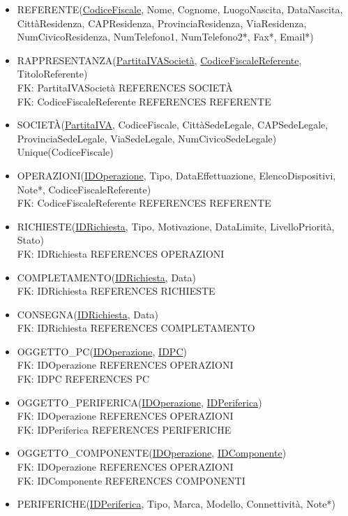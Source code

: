 \documentclass[a4paper,12pt]{report}
\begin{document}
\begin{itemize}
	\item REFERENTE(\underline{CodiceFiscale}, Nome, Cognome, LuogoNascita, DataNascita, CittàResidenza, CAPResidenza, ProvinciaResidenza, ViaResidenza, NumCivicoResidenza, NumTelefono1, NumTelefono2*, Fax*, Email*)
	\item RAPPRESENTANZA(\underline{PartitaIVASocietà}, \underline{CodiceFiscaleReferente}, TitoloReferente)
		\\ FK: PartitaIVASocietà REFERENCES SOCIETÀ
		\\ FK: CodiceFiscaleReferente REFERENCES REFERENTE
	\item SOCIETÀ(\underline{PartitaIVA}, CodiceFiscale, CittàSedeLegale, CAPSedeLegale, ProvinciaSedeLegale, ViaSedeLegale, NumCivicoSedeLegale)
		\\ Unique(CodiceFiscale)
	\item OPERAZIONI(\underline{IDOperazione}, Tipo, DataEffettuazione, ElencoDispositivi, Note*, CodiceFiscaleReferente)
		\\ FK: CodiceFiscaleReferente REFERENCES REFERENTE
	\item RICHIESTE(\underline{IDRichiesta}, Tipo, Motivazione, DataLimite, LivelloPriorità, Stato)
		\\ FK: IDRichiesta REFERENCES OPERAZIONI
	\item COMPLETAMENTO(\underline{IDRichiesta}, Data)
		\\ FK: IDRichiesta REFERENCES RICHIESTE
	\item CONSEGNA(\underline{IDRichiesta}, Data)
		\\ FK: IDRichiesta REFERENCES COMPLETAMENTO
	\item OGGETTO\_PC(\underline{IDOperazione}, \underline{IDPC})
		\\ FK: IDOperazione REFERENCES OPERAZIONI
		\\ FK: IDPC REFERENCES PC
	\item OGGETTO\_PERIFERICA(\underline{IDOperazione}, \underline{IDPeriferica})
		\\ FK: IDOperazione REFERENCES OPERAZIONI
		\\ FK: IDPeriferica REFERENCES PERIFERICHE
	\item OGGETTO\_COMPONENTE(\underline{IDOperazione}, \underline{IDComponente})
		\\ FK: IDOperazione REFERENCES OPERAZIONI
		\\ FK: IDComponente REFERENCES COMPONENTI
	\item PERIFERICHE(\underline{IDPeriferica}, Tipo, Marca, Modello, Connettività, Note*)

\end{itemize}
\end{document}

